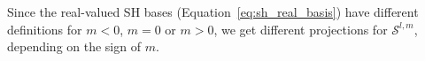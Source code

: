 \documentclass{egpubl}
\begin{document}
Since the real-valued SH bases (Equation~\ref{eq:sh_real_basis}) have different definitions for $m<0$, $m=0$ or $m>0$,  we get different projections for $\mathcal{S}^{l,m}$, depending on the sign of $m$.
\end{document}
